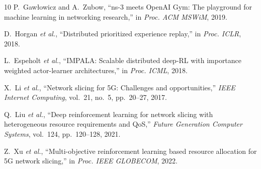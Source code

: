 \documentclass[conference]{IEEEtran}
\newcommand{\etal}{\textit{et al.}}
\begin{document}
\begin{thebibliography}{10}
P.~Gaw\l{}owicz and A.~Zubow, ``ns-3 meets OpenAI Gym: The playground for machine learning in networking research,'' in \emph{Proc. ACM MSWiM}, 2019.

D.~Horgan \etal, ``Distributed prioritized experience replay,'' in \emph{Proc. ICLR}, 2018.

L.~Espeholt \etal, ``IMPALA: Scalable distributed deep-RL with importance weighted actor-learner architectures,'' in \emph{Proc. ICML}, 2018.

X.~Li \etal, ``Network slicing for 5G: Challenges and opportunities,'' \emph{IEEE Internet Computing}, vol.~21, no.~5, pp.~20--27, 2017.

Q.~Liu \etal, ``Deep reinforcement learning for network slicing with heterogeneous resource requirements and QoS,'' \emph{Future Generation Computer Systems}, vol.~124, pp.~120--128, 2021.

Z.~Xu \etal, ``Multi-objective reinforcement learning based resource allocation for 5G network slicing,'' in \emph{Proc. IEEE GLOBECOM}, 2022.

\end{thebibliography}
\end{document}
